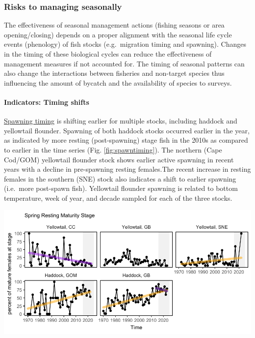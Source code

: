 \documentclass[
  10pt,
]{article}
\let\origfigure\figure
\let\endorigfigure\endfigure
\renewenvironment{figure}[1][2] {
    \expandafter\origfigure\expandafter[H]
} {
    \endorigfigure
}
\begin{document}
\subsubsection{Risks to managing seasonally}\label{risks-to-managing-seasonally}

The effectiveness of seasonal management actions (fishing seasons or area opening/closing) depends on a proper alignment with the seasonal life cycle events (phenology) of fish stocks (e.g.~migration timing and spawning). Changes in the timing of these biological cycles can reduce the effectiveness of management measures if not accounted for. The timing of seasonal patterns can also change the interactions between fisheries and non-target species thus influencing the amount of bycatch and the availability of species to surveys.

\paragraph{Indicators: Timing shifts}\label{indicators-timing-shifts}

\href{https://noaa-edab.github.io/catalog/spawn_timing.html}{Spawning timing} is shifting earlier for multiple stocks, including haddock and yellowtail flounder. Spawning of both haddock stocks occurred earlier in the year, as indicated by more resting (post-spawning) stage fish in the 2010s as compared to earlier in the time series (Fig. \ref{fig:spawntiming}). The northern (Cape Cod/GOM) yellowtail flounder stock shows earlier active spawning in recent years with a decline in pre-spawning resting females.The recent increase in resting females in the southern (SNE) stock also indicates a shift to earlier spawning (i.e.~more post-spawn fish). Yellowtail flounder spawning is related to bottom temperature, week of year, and decade sampled for each of the three stocks.

\begin{figure}

{\centering \includegraphics{midatlantic_files/figure-latex/spawntiming-1} 

}

\caption{Percent resting stage (non-spawning) mature female fish (black) from spring NEFSC bottom trawl survey with significant increases (orange) and decreases (purple) from two haddock and three yellowtail flounder stocks: CC = Cape Cod Gulf of Maine, GOM = Gulf of Maine, GB = Georges Bank, SNE = Southern New England.}\label{fig:spawntiming}
\end{figure}
\end{document}
